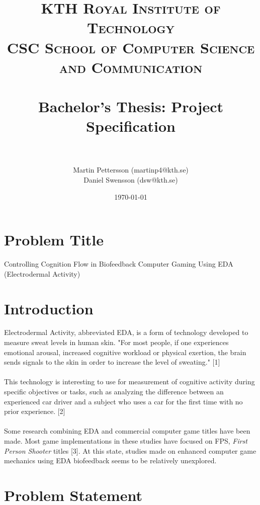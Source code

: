 \documentclass[paper=a4, fontsize=11pt]{scrartcl} %
\title{    
\normalfont \normalsize 
\textsc{KTH Royal Institute of Technology} \\ [25pt] %
\textsc{CSC School of Computer Science and Communication} \\ [25pt] %
\horrule{0.5pt} \\[0.4cm] %
\huge Bachelor's Thesis: Project Specification\\ %
\horrule{2pt} \\[0.5cm] %
}
\author{Martin Pettersson (martinp4@kth.se)\\Daniel Swensson (dsw@kth.se)} %
\date{\normalsize\today} %
\numberwithin{equation}{section} %
\numberwithin{figure}{section} %
\numberwithin{table}{section} %
\begin{document}
\maketitle %


\section{Problem Title}

\begin{center}
Controlling Cognition Flow in Biofeedback Computer Gaming Using EDA (Electrodermal Activity)
  \end{center}


\section{Introduction}
Electrodermal Activity, abbreviated EDA, is a form of technology developed to measure sweat levels in human skin. "For most people, if one experiences emotional arousal, increased cognitive workload or physical exertion, the brain sends signals to the skin in order to increase the level of sweating." [1]
\\ \\
This technology is interesting to use for measurement of cognitive activity during specific objectives or tasks, such as analyzing the difference between an experienced car driver and a subject who uses a car for the first time with no prior experience. [2]
\\ \\
Some research combining EDA and commercial computer game titles have been made. Most game implementations in these studies have focused on FPS, \textit{First Person Shooter} titles [3]. At this state, studies made on enhanced computer game mechanics using EDA biofeedback seems to be relatively unexplored.

\section{Problem Statement}
\end{document}
